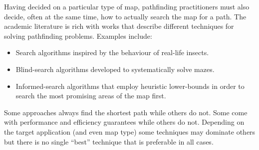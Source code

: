 Having decided on a particular type of map, pathfinding practitioners must also decide, often
at the same time, how to actually search the map for a path.
The academic literature is rich with works that describe different 
techniques for solving pathfinding problems. Examples include:
\begin{itemize}
\item Search algorithms inspired by the behaviour of real-life insects.
\item Blind-search algorithms developed to systematically solve mazes.
\item Informed-search algorithms that employ heuristic lower-bounds in order
to search the most promising areas of the map first.
\end{itemize}

\noindent Some approaches always find the shortest path while others do not. Some come with performance and 
efficiency guarantees while others do not. Depending on the target application (and even map type)
some techniques may dominate others but there is no single ``best'' technique that is preferable in all cases.

